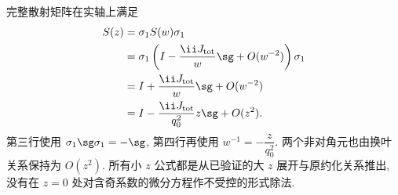 完整散射矩阵在实轴上满足
\begin{align*}
S(z)
&=\sigma_1S(w)\sigma_1\\
&=\sigma_1\left(I-\dfrac{\ii J_{\rm tot}}{w}\sg
+O(w^{-2})\right)\sigma_1\\
&=I+\dfrac{\ii J_{\rm tot}}{w}\sg+O(w^{-2})\\
&=I-\dfrac{\ii J_{\rm tot}}{q_0^2}z\sg+O(z^2).
\end{align*}
第三行使用 $\sigma_1\sg\sigma_1=-\sg$,
第四行再使用 $w^{-1}=-\dfrac{z}{q_0^2}$.
两个非对角元也由换叶关系保持为 $O(z^2)$.
所有小 $z$ 公式都是从已验证的大 $z$ 展开与原约化关系推出,
没有在 $z=0$ 处对含奇系数的微分方程作不受控的形式除法.
